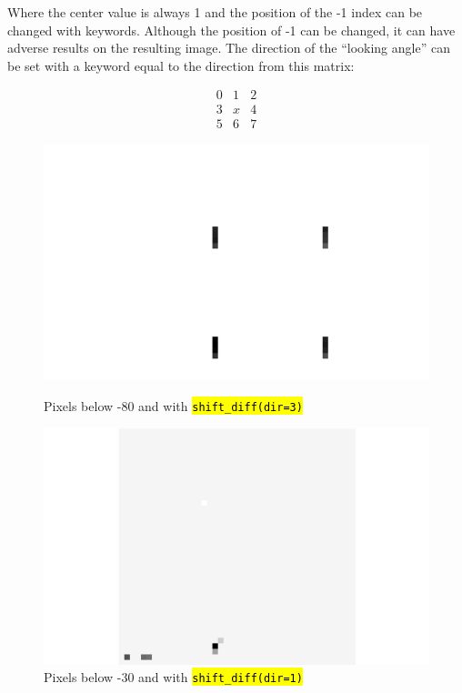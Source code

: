 \documentclass[10pt]{article}
\begin{document}
    Where the center value is always 1 and the position of the -1 index can be changed with keywords. Although the position of -1 can be changed, it can have adverse results on the resulting image. The direction of the ``looking angle'' can be set with a keyword equal to the direction from this matrix:

    \[ \begin{array}{ccc}
    0 & 1 & 2 \\
    3 & x & 4 \\
    5 & 6 & 7 \end{array}\] 

    \begin{figure}[h]
        \begin{minipage}{.45\textwidth}
            \centering
                \includegraphics[width=\linewidth]{../plots_tables_images/dir3.png}
                \caption{Pixels below -80 and with \hl{\texttt{shift\_diff(dir=3)}}}
        \end{minipage}
        \hspace{.5in}
        \begin{minipage}{.45\textwidth}
            \centering
                \includegraphics[width=\linewidth]{../plots_tables_images/dir1.png}
                \caption{Pixels below -30 and with \hl{\texttt{shift\_diff(dir=1)}}}
        \end{minipage}
    \end{figure}
\end{document}
